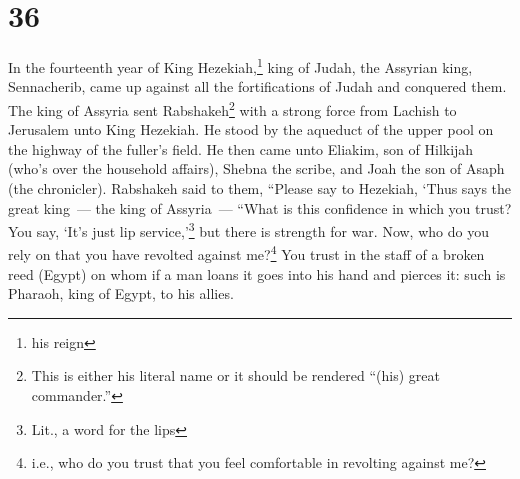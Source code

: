 \section{36}\label{Isaiah 36}
\begin{enumerate}[align=center]
     In the fourteenth year of King Hezekiah,\footnote{his reign} king of Judah, the Assyrian king, Sennacherib, came up against all the fortifications of Judah and conquered them.%
     The king of Assyria sent Rabshakeh\footnote{This is either his literal name or it should be rendered ``(his) great commander.''} with a strong force from Lachish to Jerusalem unto King Hezekiah. He stood by the aqueduct of the upper pool on the highway of the fuller's field.%
     He then came unto Eliakim, son of Hilkijah (who's over the household affairs), Shebna the scribe, and Joah the son of Asaph (the chronicler).%
     Rabshakeh said to them, ``Please say to Hezekiah, `Thus says the great king~--- the king of Assyria~--- ``What is this confidence in which you trust?%
     You say, `It's just lip service,'\footnote{Lit., a word for the lips} but there is strength for war. Now, who do you rely on that you have revolted against me?\footnote{i.e., who do you trust that you feel comfortable in revolting against me?}%
     You trust in the staff of a broken reed (Egypt) on whom if a man loans it goes into his hand and pierces it: such is Pharaoh, king of Egypt, to his allies.%
\end{enumerate}
